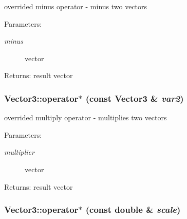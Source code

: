 overrided minus operator - minus two vectors \begin{Desc}
\item[Parameters:]
\begin{description}
\item[{\em minus}]vector \end{description}
\end{Desc}
\begin{Desc}
\item[Returns:]result vector \end{Desc}
\hypertarget{class_vector3_c65e8d0ed44872b4f23b13cee52d19f1}{
\subsubsection[operator$\ast$]{ Vector3::operator$\ast$ (const {\bf Vector3} \& {\em var2})}}
\label{class_vector3_c65e8d0ed44872b4f23b13cee52d19f1}


overrided multiply operator - multiplies two vectors \begin{Desc}
\item[Parameters:]
\begin{description}
\item[{\em multiplier}]vector \end{description}
\end{Desc}
\begin{Desc}
\item[Returns:]result vector \end{Desc}
\hypertarget{class_vector3_bf38ed065170e4b757511ba6e9ae4ff5}{
\subsubsection[operator$\ast$]{ Vector3::operator$\ast$ (const double \& {\em scale})}}
\label{class_vector3_bf38ed065170e4b757511ba6e9ae4ff5}



